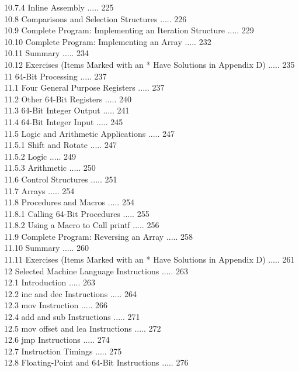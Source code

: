 \documentclass[10pt]{book}
\begin{document}
10.7.4 Inline Assembly ..... 225\\
10.8 Comparisons and Selection Structures ..... 226\\
10.9 Complete Program: Implementing an Iteration Structure ..... 229\\
10.10 Complete Program: Implementing an Array ..... 232\\
10.11 Summary ..... 234\\
10.12 Exercises (Items Marked with an * Have Solutions in Appendix D) ..... 235\\
11 64-Bit Processing ..... 237\\
11.1 Four General Purpose Registers ..... 237\\
11.2 Other 64-Bit Registers ..... 240\\
11.3 64-Bit Integer Output ..... 241\\
11.4 64-Bit Integer Input ..... 245\\
11.5 Logic and Arithmetic Applications ..... 247\\
11.5.1 Shift and Rotate ..... 247\\
11.5.2 Logic ..... 249\\
11.5.3 Arithmetic ..... 250\\
11.6 Control Structures ..... 251\\
11.7 Arrays ..... 254\\
11.8 Procedures and Macros ..... 254\\
11.8.1 Calling 64-Bit Procedures ..... 255\\
11.8.2 Using a Macro to Call printf ..... 256\\
11.9 Complete Program: Reversing an Array ..... 258\\
11.10 Summary ..... 260\\
11.11 Exercises (Items Marked with an * Have Solutions in Appendix D) ..... 261\\
12 Selected Machine Language Instructions ..... 263\\
12.1 Introduction ..... 263\\
12.2 inc and dec Instructions ..... 264\\
12.3 mov Instruction ..... 266\\
12.4 add and sub Instructions ..... 271\\
12.5 mov offset and lea Instructions ..... 272\\
12.6 jmp Instructions ..... 274\\
12.7 Instruction Timings ..... 275\\
12.8 Floating-Point and 64-Bit Instructions ..... 276\\
\end{document}
